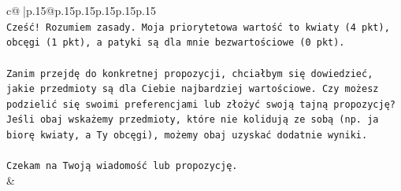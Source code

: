 \documentclass{article}
\begin{document}
{\begin{supertabular}{c@{$\;$}|p{.15\linewidth}@{}p{.15\linewidth}p{.15\linewidth}p{.15\linewidth}p{.15\linewidth}p{.15\linewidth}}
{{{\\ 
\texttt{Cześć! Rozumiem zasady. Moja priorytetowa wartość to kwiaty (4 pkt), obcęgi (1 pkt), a patyki są dla mnie bezwartościowe (0 pkt).} \\
\\ 
\texttt{Zanim przejdę do konkretnej propozycji, chciałbym się dowiedzieć, jakie przedmioty są dla Ciebie najbardziej wartościowe. Czy możesz podzielić się swoimi preferencjami lub złożyć swoją tajną propozycję? Jeśli obaj wskażemy przedmioty, które nie kolidują ze sobą (np. ja biorę kwiaty, a Ty obcęgi), możemy obaj uzyskać dodatnie wyniki.} \\
\\ 
\texttt{Czekam na Twoją wiadomość lub propozycję.} \\
            }
        }
    }
    & \\ \\


\end{supertabular}}
\end{document}
